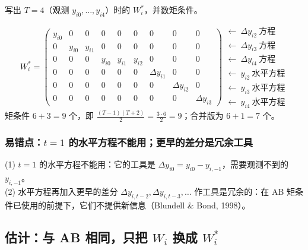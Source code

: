 \begin{exmp}[$T=4$ 的 $W_i^*$（$6\times9$）]\label{ex:U12b-Wstar4}
写出 $T=4$（观测 $y_{i0},\dots,y_{i4}$）时的 $W_i^*$，并数矩条件。

\solution
\[
W_i^*=\left(\begin{array}{cccccc|ccc}
y_{i0} & 0 & 0 & 0 & 0 & 0 & 0 & 0 & 0\\
0 & y_{i0} & y_{i1} & 0 & 0 & 0 & 0 & 0 & 0\\
0 & 0 & 0 & y_{i0} & y_{i1} & y_{i2} & 0 & 0 & 0\\ \hline
0 & 0 & 0 & 0 & 0 & 0 & \Delta y_{i1} & 0 & 0\\
0 & 0 & 0 & 0 & 0 & 0 & 0 & \Delta y_{i2} & 0\\
0 & 0 & 0 & 0 & 0 & 0 & 0 & 0 & \Delta y_{i3}
\end{array}\right)
\begin{array}{l}
\leftarrow\ \Delta y_{i2}\ \text{方程}\\
\leftarrow\ \Delta y_{i3}\ \text{方程}\\
\leftarrow\ \Delta y_{i4}\ \text{方程}\\
\leftarrow\ y_{i2}\ \text{水平方程}\\
\leftarrow\ y_{i3}\ \text{水平方程}\\
\leftarrow\ y_{i4}\ \text{水平方程}
\end{array}
\]
矩条件 $6+3=9$ 个，即 $\frac{(T-1)(T+2)}{2}=\frac{3\cdot6}{2}=9$；合并版为 $6+1=7$ 个。
\end{exmp}

\subsubsection{易错点：\texorpdfstring{$t=1$}{t=1} 的水平方程不能用；更早的差分是冗余工具}

\begin{note}[水平方程的工具]
(1) $t=1$ 的水平方程不能用：它的工具是 $\Delta y_{i0}=y_{i0}-y_{i,-1}$，需要观测不到的 $y_{i,-1}$。\\
(2) 水平方程再加入更早的差分 $\Delta y_{i,t-2},\Delta y_{i,t-3},\dots$ 作工具是冗余的：在 AB 矩条件已使用的前提下，它们不提供新信息（Blundell \& Bond, 1998）。
\end{note}

\subsection{估计：与 AB 相同，只把 \texorpdfstring{$W_i$}{W\_i} 换成 \texorpdfstring{$W_i^*$}{W\_i*}}

